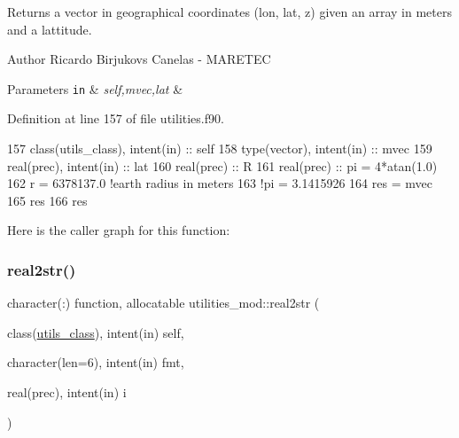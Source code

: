 Returns a vector in geographical coordinates (lon, lat, z) given an array in meters and a lattitude. 

\begin{DoxyAuthor}{Author}
Ricardo Birjukovs Canelas -\/ M\+A\+R\+E\+T\+EC 
\end{DoxyAuthor}

\begin{DoxyParams}[1]{Parameters}
\mbox{\tt in}  & {\em self,mvec,lat} & \\
\hline
\end{DoxyParams}


Definition at line 157 of file utilities.\+f90.


\begin{DoxyCode}
157     \textcolor{keywordtype}{class}(utils\_class), \textcolor{keywordtype}{intent(in)} :: self
158     \textcolor{keywordtype}{type}(vector), \textcolor{keywordtype}{intent(in)} :: mvec
159     \textcolor{keywordtype}{real(prec)}, \textcolor{keywordtype}{intent(in)} :: lat
160     \textcolor{keywordtype}{real(prec)} :: R
161     \textcolor{keywordtype}{real(prec)} :: pi = 4*atan(1.0)
162     r = 6378137.0 \textcolor{comment}{!earth radius in meters}
163     \textcolor{comment}{!pi = 3.1415926}
164     res = mvec
165     res%
166     res%
\end{DoxyCode}
Here is the caller graph for this function\+:
\mbox{\label{namespaceutilities__mod_a2c8481f2b9f4cddf8391bd1e8b624335}} 
\subsubsection{\texorpdfstring{real2str()}{real2str()}}
{\footnotesize\ttfamily character(\+:) function, allocatable utilities\+\_\+mod\+::real2str (\begin{DoxyParamCaption}\item[{class(\mbox{\hyperlink{structutilities__mod_1_1utils__class}{utils\+\_\+class}}), intent(in)}]{self,  }\item[{character(len=6), intent(in)}]{fmt,  }\item[{real(prec), intent(in)}]{i }\end{DoxyParamCaption})\hspace{0.3cm}{\ttfamily [private]}}



